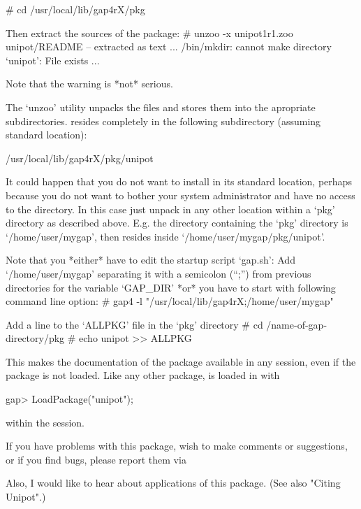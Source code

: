 \begintt
# cd /usr/local/lib/gap4rX/pkg
\endtt

Then extract the sources of the {\Unipot} package:
\begintt
# unzoo -x unipot1r1.zoo
unipot/README     -- extracted as text
...
/bin/mkdir: cannot make directory `unipot': File exists
...
\endtt

Note that the warning is *not* serious.

The `unzoo' utility unpacks the files and stores them into the apropriate
subdirectories. {\Unipot} resides completely in the following subdirectory
(assuming standard location):

\begintt
/usr/local/lib/gap4rX/pkg/unipot
\endtt



It could happen that you do not want to install {\Unipot} in its standard
location,  perhaps  because  you  do  not  want  to  bother  your  system
administrator and have  no access to the {\GAP} directory.  In  this case
just unpack  {\Unipot} in any other location within a `pkg'  directory as
described  above. E.g.  the directory containing  the  `pkg' directory is
`/home/user/mygap',       then       {\Unipot}       resides       inside
`/home/user/mygap/pkg/unipot'.

Note that you *either* have to edit the startup script `gap.sh':
\beginlist%
   Add `/home/user/mygap' separating it with a semicolon (``;'')
   from previous directories for the variable `GAP_DIR'
\endlist
*or* you have to start {\GAP} with following command line option:
\begintt
# gap4 -l "/usr/local/lib/gap4rX;/home/user/mygap"
\endtt



Add a line to the `ALLPKG' file in the `pkg' directory
\begintt
# cd /name-of-gap-directory/pkg
# echo unipot >> ALLPKG
\endtt

This makes the  documentation  of the package  available  in any  {}
session,  even  if the  package  is not loaded. Like  any other  package,
{\Unipot} is loaded in {\GAP} with

\beginexample
gap> LoadPackage("unipot");
\endexample

within the {} session.

If you have problems with this package, wish to make comments
or suggestions, or if you find bugs, please report them via


Also, I would like to hear about applications of this package.
(See also "Citing Unipot".)




